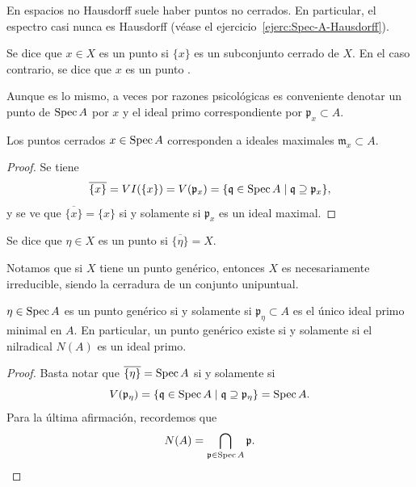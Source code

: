 \documentclass{article}
\numberwithin{equation}{section}
\theoremstyle{definition}
\begin{document}
En espacios no Hausdorff suele haber puntos no cerrados. En particular,
el espectro casi nunca es Hausdorff (véase el
ejercicio~\ref{ejerc:Spec-A-Hausdorff}).

\begin{definicion}
  Se dice que $x \in X$ es un punto  si $\{ x \}$ es
  un subconjunto cerrado de $X$. En el caso contrario, se dice que $x$ es
  un punto .
\end{definicion}

Aunque es lo mismo, a veces por razones psicológicas es conveniente denotar
un punto de $\operatorname{Spec} A$ por $x$ y el ideal primo correspondiente por
$\mathfrak{p}_x \subset A$.

\begin{observacion}
  Los puntos cerrados $x \in \operatorname{Spec} A$ corresponden a ideales maximales
  $\mathfrak{m}_x \subset A$.

  \begin{proof}
    Se tiene
    \[ \overline{\{ x \}} = VI (\{ x \}) = V (\mathfrak{p}_x) =
       \{ \mathfrak{q} \in \operatorname{Spec} A \mid \mathfrak{q} \supseteq \mathfrak{p}_x \}, \]
    y se ve que $\overline{\{ x \}} = \{ x \}$ si y solamente si
    $\mathfrak{p}_x$ es un ideal maximal.
  \end{proof}
\end{observacion}

\begin{definicion}
  Se dice que $\eta \in X$ es un punto  si
  $\overline{\{ \eta \}} = X$.
\end{definicion}

Notamos que si $X$ tiene un punto genérico, entonces $X$ es necesariamente
irreducible, siendo la cerradura de un conjunto unipuntual.

\begin{observacion}
  \label{obs:punto-generico-primo-minimal}
  $\eta \in \operatorname{Spec} A$ es un punto genérico si y solamente si
  $\mathfrak{p}_\eta \subset A$ es el único ideal primo minimal en $A$.
  En particular, un punto genérico existe si y solamente si el nilradical
  $N (A)$ es un ideal primo.

  \begin{proof}
    Basta notar que $\overline{\{ \eta \}} = \operatorname{Spec} A$ si y solamente si
    \[ V (\mathfrak{p}_\eta) =
       \{ \mathfrak{q} \in \operatorname{Spec} A \mid \mathfrak{q} \supseteq \mathfrak{p}_\eta \}
       = \operatorname{Spec} A. \]
    Para la última afirmación, recordemos que
    \[ N (A) = \bigcap_{\mathfrak{p} \in \operatorname{Spec} A} \mathfrak{p}. \qedhere \]
  \end{proof}
\end{observacion}
\end{document}
